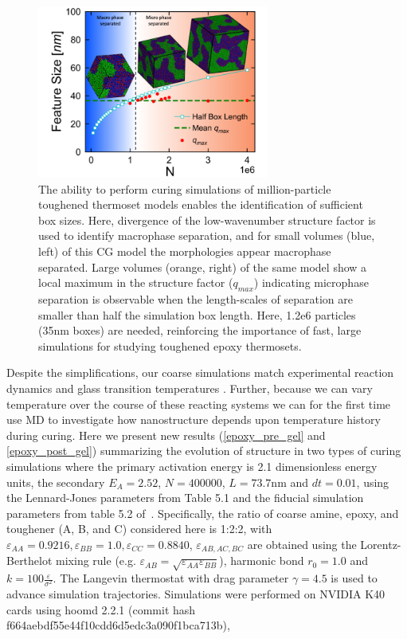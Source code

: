 \begin{figure}
    \centering
    \includegraphics[width=3in]{figures/pub4/epoxy_toc.png}
    \caption{The ability to perform curing simulations of million-particle toughened thermoset models enables the identification of sufficient box sizes. Here, divergence of the low-wavenumber structure factor is used to identify macrophase separation, and for small volumes (blue, left) of this CG model the morphologies appear macrophase separated. Large volumes (orange, right) of the same model show a local maximum in the structure factor ($q_{max}$) indicating microphase separation is observable when the length-scales of separation are smaller than half the simulation box length. Here, 1.2e6 particles (35nm boxes) are needed, reinforcing the importance of fast, large simulations for studying toughened epoxy thermosets.
    }
    \label{epoxy_toc} %
\end{figure}

Despite the simplifications, our coarse simulations match experimental reaction dynamics and glass transition temperatures \cite{thomas2018new}.
Further, because we can vary temperature over the course of these reacting systems we can for the first time use MD to investigate how nanostructure depends upon temperature history during curing.
Here we present new results (\autoref{epoxy_pre_gel} and \autoref{epoxy_post_gel}) summarizing the evolution of structure in two types of curing simulations where the primary activation energy is 2.1 dimensionless energy units, the secondary $E_A=2.52$, $N=400000$, $L=73.7$nm and $dt=0.01$, using the Lennard-Jones parameters from Table 5.1 and the fiducial simulation parameters from  table 5.2 of~\cite{thomas2018new}.
Specifically, the ratio of coarse amine, epoxy, and toughener (A, B, and C) considered here is 1:2:2, with $\varepsilon_{AA}=0.9216, \varepsilon_{BB}=1.0, \varepsilon_{CC}=0.8840$, $\varepsilon_{AB,AC,BC}$ are obtained using the Lorentz-Berthelot mixing rule (e.g. $\varepsilon_{AB}=\sqrt{\varepsilon_{AA}\varepsilon_{BB}}$), harmonic bond $r_0=1.0$ and $k=100 \frac{\varepsilon}{\sigma^2}$. %
The Langevin thermostat with drag parameter $\gamma=4.5$ is used to advance simulation trajectories.
Simulations were performed on NVIDIA K40 cards using hoomd 2.2.1 (commit hash f664aebdf55e44f10cdd6d5edc3a090f1bca713b), 

